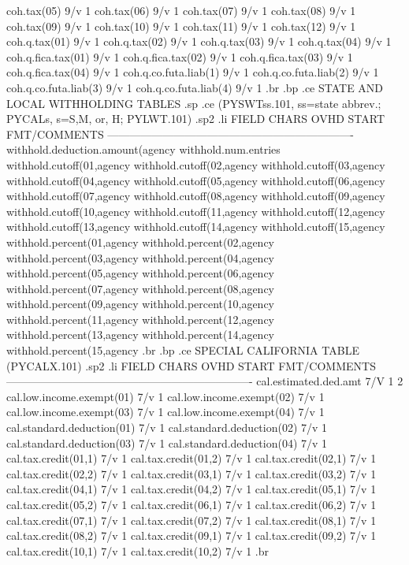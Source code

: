 coh.tax(05)		9/v	1
coh.tax(06)		9/v	1
coh.tax(07)		9/v	1
coh.tax(08)		9/v	1
coh.tax(09)		9/v	1
coh.tax(10)		9/v	1
coh.tax(11)		9/v	1
coh.tax(12)		9/v	1
coh.q.tax(01)		9/v	1
coh.q.tax(02)		9/v	1
coh.q.tax(03)		9/v	1
coh.q.tax(04)		9/v	1
coh.q.fica.tax(01)	9/v	1
coh.q.fica.tax(02)	9/v	1
coh.q.fica.tax(03)	9/v	1
coh.q.fica.tax(04)	9/v	1
coh.q.co.futa.liab(1)	9/v	1
coh.q.co.futa.liab(2)	9/v	1
coh.q.co.futa.liab(3)	9/v	1
coh.q.co.futa.liab(4)	9/v	1
.br
.bp
.ce
STATE AND LOCAL WITHHOLDING TABLES
.sp
.ce
(PYSWTss.101, ss=state abbrev.; PYCALs, s=S,M, or, H; PYLWT.101)
.sp2
.li
FIELD				      CHARS  OVHD  START FMT/COMMENTS
-------------------------------------------------------------------
withhold.deduction.amount(agency%
withhold.num.entries%
withhold.cutoff(01,agency%
withhold.cutoff(02,agency%
withhold.cutoff(03,agency%
withhold.cutoff(04,agency%
withhold.cutoff(05,agency%
withhold.cutoff(06,agency%
withhold.cutoff(07,agency%
withhold.cutoff(08,agency%
withhold.cutoff(09,agency%
withhold.cutoff(10,agency%
withhold.cutoff(11,agency%
withhold.cutoff(12,agency%
withhold.cutoff(13,agency%
withhold.cutoff(14,agency%
withhold.cutoff(15,agency%
withhold.percent(01,agency%
withhold.percent(02,agency%
withhold.percent(03,agency%
withhold.percent(04,agency%
withhold.percent(05,agency%
withhold.percent(06,agency%
withhold.percent(07,agency%
withhold.percent(08,agency%
withhold.percent(09,agency%
withhold.percent(10,agency%
withhold.percent(11,agency%
withhold.percent(12,agency%
withhold.percent(13,agency%
withhold.percent(14,agency%
withhold.percent(15,agency%
.br
.bp
.ce
SPECIAL CALIFORNIA TABLE  (PYCALX.101)
.sp2
.li
FIELD			       CHARS	OVHD	START	FMT/COMMENTS
-------------------------------------------------------------------
cal.estimated.ded.amt		7/V	1	2
cal.low.income.exempt(01)	7/v	1
cal.low.income.exempt(02)	7/v	1
cal.low.income.exempt(03)	7/v	1
cal.low.income.exempt(04)	7/v	1
cal.standard.deduction(01)	7/v	1
cal.standard.deduction(02)	7/v	1
cal.standard.deduction(03)	7/v	1
cal.standard.deduction(04)	7/v	1
cal.tax.credit(01,1)		7/v	1
cal.tax.credit(01,2)		7/v	1
cal.tax.credit(02,1)		7/v	1
cal.tax.credit(02,2)		7/v	1
cal.tax.credit(03,1)		7/v	1
cal.tax.credit(03,2)		7/v	1
cal.tax.credit(04,1)		7/v	1
cal.tax.credit(04,2)		7/v	1
cal.tax.credit(05,1)		7/v	1
cal.tax.credit(05,2)		7/v	1
cal.tax.credit(06,1)		7/v	1
cal.tax.credit(06,2)		7/v	1
cal.tax.credit(07,1)		7/v	1
cal.tax.credit(07,2)		7/v	1
cal.tax.credit(08,1)		7/v	1
cal.tax.credit(08,2)		7/v	1
cal.tax.credit(09,1)		7/v	1
cal.tax.credit(09,2)		7/v	1
cal.tax.credit(10,1)		7/v	1
cal.tax.credit(10,2)		7/v	1
.br
